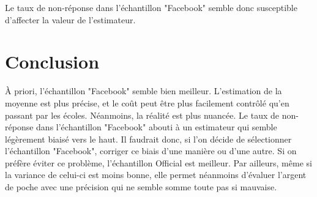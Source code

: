 \documentclass[11pt,a4paper]{report}
\begin{document}
Le taux de non-réponse dans l'échantillon "Facebook" semble donc susceptible d'affecter la valeur de l'estimateur.\bigskip

\section*{Conclusion}

À priori, l'échantillon "Facebook" semble bien meilleur. L'estimation de la moyenne est plus précise, et le coût peut être plus facilement contrôlé qu'en passant par les écoles. Néanmoins, la réalité est plus nuancée. Le taux de non-réponse dans l'échantillon "Facebook" abouti à un estimateur qui semble légèrement biaisé vers le haut. Il faudrait donc, si l'on décide de sélectionner l'échantillon "Facebook", corriger ce biais d'une manière ou d'une autre. Si on préfère éviter ce problème, l'échantillon Official est meilleur. Par ailleurs, même si la variance de celui-ci est moins bonne, elle permet néanmoins d'évaluer l'argent de poche avec une précision qui ne semble somme toute pas si mauvaise.
\end{document}
